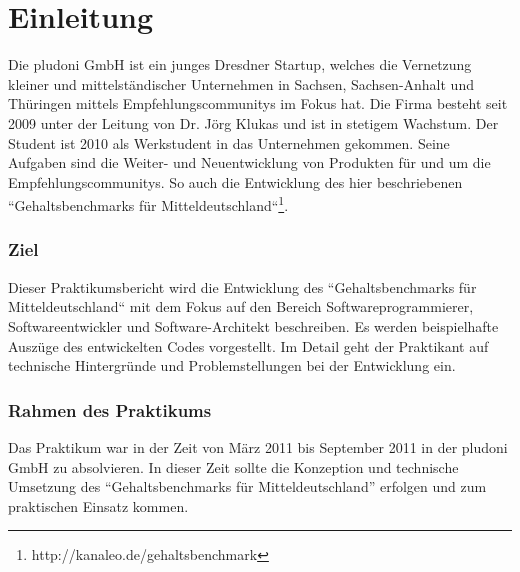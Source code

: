 \part{Einleitung}
Die pludoni GmbH ist ein junges Dresdner Startup, welches die Vernetzung kleiner und mittelständischer Unternehmen in Sachsen, Sachsen-Anhalt und Thüringen 
mittels Empfehlungscommunitys im Fokus hat. Die Firma besteht seit 2009 unter der Leitung von Dr. Jörg Klukas und ist in stetigem Wachstum. 
Der Student ist 2010 als Werkstudent in das Unternehmen gekommen. Seine Aufgaben sind die Weiter- und Neuentwicklung von Produkten für und um die Empfehlungscommunitys. 
So auch die Entwicklung des hier beschriebenen ``Gehaltsbenchmarks f\"ur Mitteldeutschland``\footnote{http://kanaleo.de/gehaltsbenchmark}. 
\section{Ziel}
Dieser Praktikumsbericht wird die Entwicklung des ``Gehaltsbenchmarks für Mitteldeutschland`` mit dem Fokus auf den Bereich Softwareprogrammierer, Softwareentwickler und Software-Architekt beschreiben. 
Es werden beispielhafte Auszüge des entwickelten Codes vorgestellt. Im Detail geht der Praktikant auf technische Hintergründe und Problemstellungen bei der Entwicklung ein.
\section{Rahmen des Praktikums}
Das Praktikum war in der Zeit von März 2011 bis September 2011 in der pludoni GmbH zu absolvieren. 
In dieser Zeit sollte die Konzeption und technische Umsetzung des ``Gehaltsbenchmarks für Mitteldeutschland'' erfolgen und zum praktischen Einsatz kommen.
